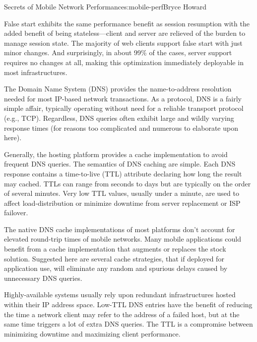 \begin{aosachapter}{Secrets of Mobile Network Performance}{s:mobile-perf}{Bryce Howard}

False start exhibits the same performance benefit as session resumption
with the added benefit of being stateless---client and server are
relieved of the burden to manage session state. The majority of web
clients support false start with just minor changes. And surprisingly,
in about 99\% of the cases, server support requires no changes at all,
making this optimization immediately deployable in most infrastructures.


The Domain Name System (DNS) provides the name-to-address resolution
needed for most IP-based network transactions. As a protocol, DNS is a
fairly simple affair, typically operating without need for a reliable
transport protocol (e.g., TCP). Regardless, DNS queries often exhibit
large and wildly varying response times (for reasons too complicated and
numerous to elaborate upon here).


Generally, the hosting platform provides a cache implementation to avoid
frequent DNS queries. The semantics of DNS caching are simple. Each DNS
response contains a time-to-live (TTL) attribute declaring how long the
result may cached. TTLs can range from seconds to days but are typically
on the order of several minutes. Very low TTL values, usually under a
minute, are used to affect load-distribution or minimize downtime from
server replacement or ISP failover.

The native DNS cache implementations of most platforms don't account for
elevated round-trip times of mobile networks. Many mobile applications
could benefit from a cache implementation that augments or replaces the
stock solution. Suggested here are several cache strategies, that if
deployed for application use, will eliminate any random and spurious
delays caused by unnecessary DNS queries.


Highly-available systems usually rely upon redundant infrastructures
hosted within their IP address space. Low-TTL DNS entries have the
benefit of reducing the time a network client may refer to the address
of a failed host, but at the same time triggers a lot of extra DNS
queries. The TTL is a compromise between minimizing downtime and
maximizing client performance.


\end{aosachapter}
